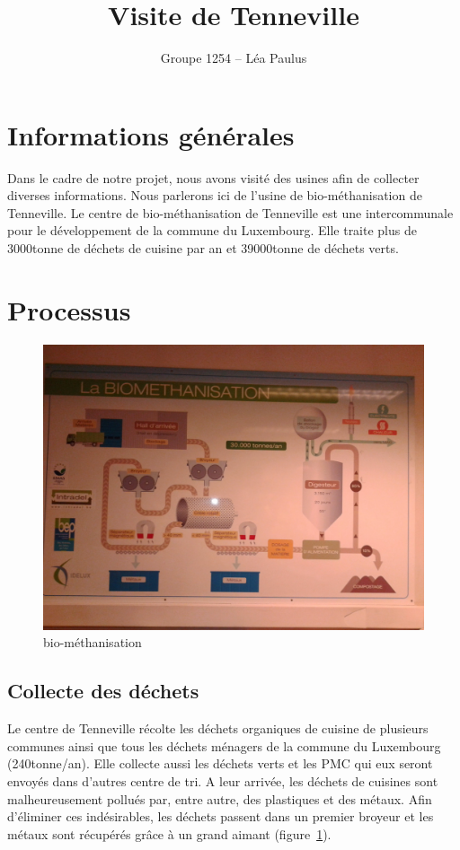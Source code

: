 \documentclass{article}
\title{Visite de Tenneville}
\author{Groupe 1254 -- Léa Paulus}
\begin{document}
\maketitle
\section{Informations générales}
Dans le cadre de notre projet, nous avons visité des usines afin de collecter diverses informations.
Nous parlerons ici de l'usine de bio-méthanisation de Tenneville.
Le centre de bio-méthanisation de Tenneville est une intercommunale pour le développement de la commune du Luxembourg.
Elle traite plus de \unit{3000}{tonne} de déchets de cuisine par an et \unit{39000}{tonne} de déchets verts.
\section{Processus}
\begin{figure}
  \centering
  \includegraphics[scale=0.07]{IMG_20141105_105627.jpg}
  \caption{bio-méthanisation}
  \label{fig:biomethanisation}
\end{figure}
\subsection{Collecte des déchets}
Le centre de Tenneville récolte les déchets organiques de cuisine de plusieurs communes ainsi que tous les déchets ménagers de la commune du Luxembourg (\unit{240}{tonne/an}). Elle collecte aussi les déchets verts et les PMC qui eux seront envoyés dans d'autres centre de tri.
A leur arrivée, les déchets de cuisines sont malheureusement pollués par, entre autre, des plastiques  et des métaux. Afin d'éliminer ces indésirables, les déchets passent dans un premier broyeur et les métaux sont récupérés grâce à un grand aimant (figure~\ref{fig:biomethanisation}). 
\end{document}
